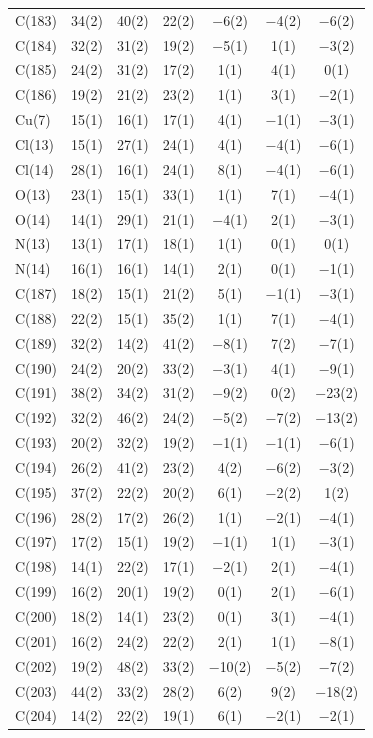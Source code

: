 \begin{center}
{\begin{supertabular}{lcccccc}
C(183)&34(2) &40(2)&22(2) &$-$6(2)&$-$4(2) &$-$6(2)\\
C(184)&32(2) &31(2)&19(2) &$-$5(1)&1(1) &$-$3(2)\\
C(185)&24(2) &31(2)&17(2) &1(1)&4(1) &0(1)\\
C(186)&19(2) &21(2)&23(2) &1(1)&3(1) &$-$2(1)\\
Cu(7)&15(1) &16(1)&17(1) &4(1)&$-$1(1) &$-$3(1)\\
Cl(13)&15(1) &27(1)&24(1) &4(1)&$-$4(1) &$-$6(1)\\
Cl(14)&28(1) &16(1)&24(1) &8(1)&$-$4(1) &$-$6(1)\\
O(13)&23(1) &15(1)&33(1) &1(1)&7(1) &$-$4(1)\\
O(14)&14(1) &29(1)&21(1) &$-$4(1)&2(1) &$-$3(1)\\
N(13)&13(1) &17(1)&18(1) &1(1)&0(1) &0(1)\\
N(14)&16(1) &16(1)&14(1) &2(1)&0(1) &$-$1(1)\\
C(187)&18(2) &15(1)&21(2) &5(1)&$-$1(1) &$-$3(1)\\
C(188)&22(2) &15(1)&35(2) &1(1)&7(1) &$-$4(1)\\
C(189)&32(2) &14(2)&41(2) &$-$8(1)&7(2) &$-$7(1)\\
C(190)&24(2) &20(2)&33(2) &$-$3(1)&4(1) &$-$9(1)\\
C(191)&38(2) &34(2)&31(2) &$-$9(2)&0(2) &$-$23(2)\\
C(192)&32(2) &46(2)&24(2) &$-$5(2)&$-$7(2) &$-$13(2)\\
C(193)&20(2) &32(2)&19(2) &$-$1(1)&$-$1(1) &$-$6(1)\\
C(194)&26(2) &41(2)&23(2) &4(2)&$-$6(2) &$-$3(2)\\
C(195)&37(2) &22(2)&20(2) &6(1)&$-$2(2) &1(2)\\
C(196)&28(2) &17(2)&26(2) &1(1)&$-$2(1) &$-$4(1)\\
C(197)&17(2) &15(1)&19(2) &$-$1(1)&1(1) &$-$3(1)\\
C(198)&14(1) &22(2)&17(1) &$-$2(1)&2(1) &$-$4(1)\\
C(199)&16(2) &20(1)&19(2) &0(1)&2(1) &$-$6(1)\\
C(200)&18(2) &14(1)&23(2) &0(1)&3(1) &$-$4(1)\\
C(201)&16(2) &24(2)&22(2) &2(1)&1(1) &$-$8(1)\\
C(202)&19(2) &48(2)&33(2) &$-$10(2)&$-$5(2) &$-$7(2)\\
C(203)&44(2) &33(2)&28(2) &6(2)&9(2) &$-$18(2)\\
C(204)&14(2) &22(2)&19(1) &6(1)&$-$2(1) &$-$2(1)\\

\end{supertabular}}
\end{center}
